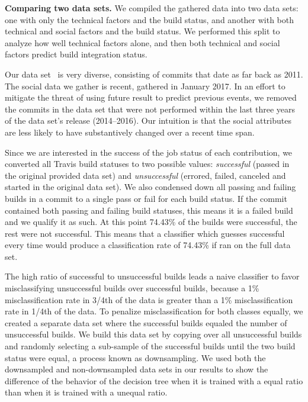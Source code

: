 \documentclass[10pt, conference]{IEEEtran}
\begin{document}
\vspace{1ex}
\noindent\textbf{Comparing two data sets.} We compiled the gathered data into 
two data sets: one with only the technical
factors and the build status, and another with both technical and social
factors and the build status. We performed this split to analyze how well technical factors alone,
and then both technical and social
factors predict build integration status.

Our data set~\cite{msr17challenge} is very diverse, consisting
of commits that date as far back as 2011. The social data we 
gather is recent, gathered in January 2017. In an effort to mitigate the threat of
using future result to predict previous events,
we removed the commits in the data set that were not performed within the last
three years of the data set's release (2014--2016).  Our intuition is
that the social attributes are less likely to have substantively changed over a
recent time span. 

Since we are interested in the success of the job status of each contribution, we 
converted all Travis build statuses to two possible values:
\emph{successful} (passed in the original provided data set) and \emph{unsuccessful}
(errored, failed, canceled
and started in the original data set). We also condensed down all passing and
failing builds in a commit to a single pass or fail for each build status.  If
the commit contained both passing and failing build statuses, this means it is a failed build and we qualify it as such.
At this point 74.43\% of the builds were successful, the rest were not
successful.  This means that a classifier which guesses successful every time
would produce a classification rate of 74.43\% if ran on the full data
set. 

The high ratio of successful to unsuccessful builds leads a naive classifier to 
favor misclassifying unsuccessful builds over successful builds, because a 1\%
misclassification rate in 3/4th of the data is greater than a 1\%
misclassification rate in 1/4th of the data.  To penalize misclassification for
both classes equally, we created a separate data set where the
successful builds equaled the number of unsuccessful builds.  
We build this data set by copying over all unsuccessful builds and randomly
selecting a sub-sample of the successful builds until the two build status were
equal, a process known as downsampling.  We used 
both the downsampled and non-downsampled data sets in our results to show the 
difference of the behavior of the decision tree when it is trained with a equal 
ratio than when it is trained with a unequal ratio.
\end{document}
